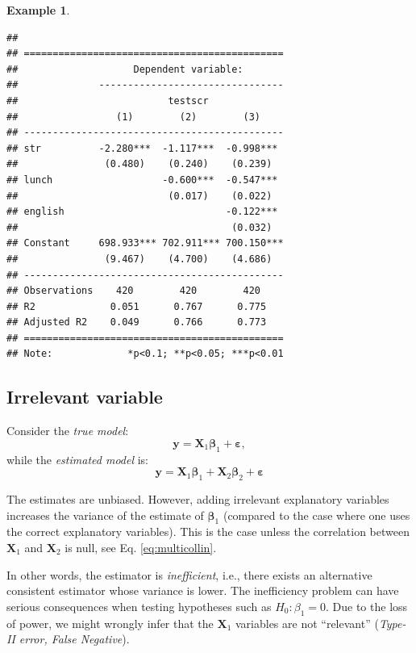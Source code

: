 \documentclass[
  12pt,
]{book}
\theoremstyle{definition}
\theoremstyle{definition}
\newtheorem{example}{Example}[chapter]
\theoremstyle{definition}
\theoremstyle{definition}
\theoremstyle{remark}
\begin{document}
\begin{example}
\begin{verbatim}
## 
## =============================================
##                    Dependent variable:       
##              --------------------------------
##                          testscr             
##                 (1)        (2)        (3)    
## ---------------------------------------------
## str          -2.280***  -1.117***  -0.998*** 
##               (0.480)    (0.240)    (0.239)  
## lunch                   -0.600***  -0.547*** 
##                          (0.017)    (0.022)  
## english                            -0.122*** 
##                                     (0.032)  
## Constant     698.933*** 702.911*** 700.150***
##               (9.467)    (4.700)    (4.686)  
## ---------------------------------------------
## Observations    420        420        420    
## R2             0.051      0.767      0.775   
## Adjusted R2    0.049      0.766      0.773   
## =============================================
## Note:             *p<0.1; **p<0.05; ***p<0.01
\end{verbatim}

\end{example}

\hypertarget{irrelevant}{%
\subsection{Irrelevant variable}\label{irrelevant}}

Consider the \emph{true model}:
\[
\mathbf{y} = \mathbf{X}_1\boldsymbol\beta_1 + \boldsymbol\varepsilon,
\]
while the \emph{estimated model} is:
\[
\mathbf{y} = \mathbf{X}_1\boldsymbol\beta_1 + \mathbf{X}_2\boldsymbol\beta_2 + \boldsymbol\varepsilon
\]

The estimates are unbiased. However, adding irrelevant explanatory variables increases the variance of the estimate of \(\boldsymbol\beta_1\) (compared to the case where one uses the correct explanatory variables). This is the case unless the correlation between \(\mathbf{X}_1\) and \(\mathbf{X}_2\) is null, see Eq. \eqref{eq:multicollin}.

In other words, the estimator is \emph{inefficient}, i.e., there exists an alternative consistent estimator whose variance is lower. The inefficiency problem can have serious consequences when testing hypotheses such as \(H_0: \beta_1 = 0\). Due to the loss of power, we might wrongly infer that the \(\mathbf{X}_1\) variables are not ``relevant'' (\emph{Type-II error, False Negative}).
\end{document}
